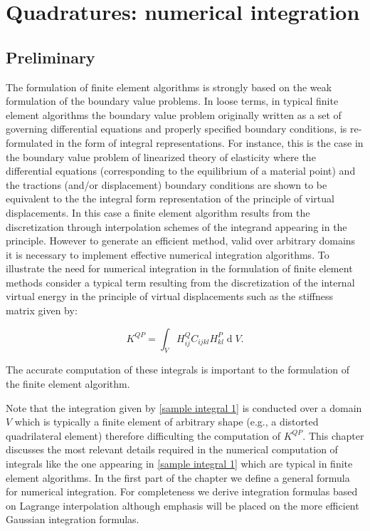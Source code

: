 \graphicspath{ {./img/TheFEM/} }
\chapter{Quadratures: numerical integration}

\section*{Preliminary}

The formulation of finite element algorithms is strongly based on the weak formulation of the boundary value problems. In loose terms, in typical finite element algorithms the boundary value problem originally written as a set of governing differential equations and properly specified boundary conditions, is re-formulated in the form of integral representations. For instance, this is the case in the boundary value problem of linearized theory of elasticity where the differential equations (corresponding to the equilibrium of a material point) and the tractions (and/or displacement) boundary conditions are shown to be equivalent to the the integral form representation of the principle of virtual displacements. In this case a finite element algorithm results from the discretization through interpolation schemes of the integrand appearing in the principle. However to generate an efficient method, valid over arbitrary domains it is necessary to implement effective numerical integration algorithms. To illustrate the need for numerical integration in the formulation of finite element methods consider a typical term resulting from the discretization of the internal virtual energy in the principle of virtual displacements such as the stiffness matrix given by: 



\begin{equation}
K^{QP} = \int_VH_{ij}^QC_{ijkl}H_{kl}^P\operatorname dV.
\label{sample integral 1}
\end{equation}

The accurate computation of these integrals is important to the formulation of the finite element algorithm. 

Note that the integration given by \eqref{sample integral 1} is conducted over a domain $V$ which is typically a finite element of arbitrary shape (e.g., a distorted quadrilateral element) therefore difficulting the computation of $K^{QP}$. This chapter discusses the most relevant details required in the numerical computation of integrals like the one appearing in \eqref{sample integral 1} which are typical in finite element algorithms. In the first part of the chapter we define a general formula for numerical integration. For completeness we derive integration formulas based on Lagrange interpolation although emphasis will be placed on the more efficient Gaussian integration formulas.

